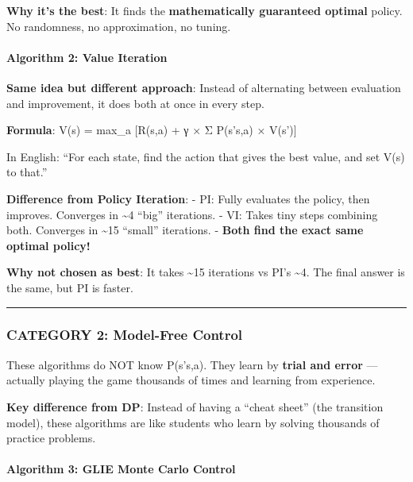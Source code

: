\documentclass[
]{article}
\begin{document}
\textbf{Why it's the best}: It finds the \textbf{mathematically
guaranteed optimal} policy. No randomness, no approximation, no tuning.

\hypertarget{algorithm-2-value-iteration}{%
\paragraph{Algorithm 2: Value
Iteration}\label{algorithm-2-value-iteration}}

\textbf{Same idea but different approach}: Instead of alternating
between evaluation and improvement, it does both at once in every step.

\textbf{Formula}: V(s) = max\_a {[}R(s,a) + γ × Σ P(s'\textbar s,a) ×
V(s'){]}

In English: ``For each state, find the action that gives the best value,
and set V(s) to that.''

\textbf{Difference from Policy Iteration}: - PI: Fully evaluates the
policy, then improves. Converges in \textasciitilde4 ``big'' iterations.
- VI: Takes tiny steps combining both. Converges in \textasciitilde15
``small'' iterations. - \textbf{Both find the exact same optimal
policy!}

\textbf{Why not chosen as best}: It takes \textasciitilde15 iterations
vs PI's \textasciitilde4. The final answer is the same, but PI is
faster.

\begin{center}\rule{0.5\linewidth}{0.5pt}\end{center}

\hypertarget{category-2-model-free-control}{%
\subsubsection{CATEGORY 2: Model-Free
Control}\label{category-2-model-free-control}}

These algorithms do NOT know P(s'\textbar s,a). They learn by
\textbf{trial and error} --- actually playing the game thousands of
times and learning from experience.

\textbf{Key difference from DP}: Instead of having a ``cheat sheet''
(the transition model), these algorithms are like students who learn by
solving thousands of practice problems.

\hypertarget{algorithm-3-glie-monte-carlo-control}{%
\paragraph{Algorithm 3: GLIE Monte Carlo
Control}\label{algorithm-3-glie-monte-carlo-control}}
\end{document}
